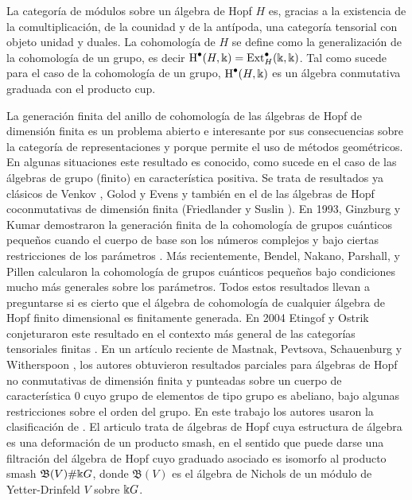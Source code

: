 \documentclass[fleqn,../tesis.tex]{subfiles}
\begin{document}
La categoría de módulos sobre un álgebra de Hopf $H$ es, gracias a la existencia de la comultiplicación, de la counidad y de la antípoda, una categoría
tensorial con objeto unidad y duales. La cohomología de $H$ se define como la generalización de la cohomología de un grupo, es decir
$\operatorname{H}^{\bullet}(H, \Bbbk) = \operatorname{Ext}_H^{\bullet}(\Bbbk, \Bbbk)$. Tal como sucede para el caso de la cohomología de un grupo, $\operatorname{H}^{\bullet}(H, \Bbbk)$
es un álgebra conmutativa graduada con el producto cup.

La generación finita del anillo de cohomología de las álgebras de Hopf de dimensión finita es un problema abierto e interesante por sus 
consecuencias sobre la categoría de representaciones y porque permite el uso de métodos geométricos. En algunas situaciones este resultado 
es conocido, como sucede en el caso de las álgebras 
de grupo (finito) en característica positiva. Se trata de resultados ya clásicos de Venkov \cite{Ve}, Golod \cite{Go} y Evens \cite{Ev} y también en el de las álgebras de 
Hopf coconmutativas de dimensión finita (Friedlander y Suslin \cite{FrSu}). En 1993, Ginzburg y Kumar demostraron la generación finita de 
la cohomología de grupos 
cuánticos peque\~nos cuando el cuerpo de base son los números complejos y bajo ciertas restricciones de los parámetros \cite{GiKu}. Más recientemente, Bendel, Nakano, Parshall, y Pillen \cite{BNPP} calcularon la cohomología de grupos cuánticos pequeños bajo condiciones mucho 
más generales sobre los parámetros. 
Todos estos resultados llevan a preguntarse si es cierto que el álgebra de cohomología de cualquier álgebra de Hopf finito dimensional es 
finitamente generada. 
En 2004 Etingof y Ostrik conjeturaron este resultado en el contexto más general de las categorías tensoriales finitas \cite{EtOs}. 
En un artículo reciente de Mastnak, Pevtsova, Schauenburg y Witherspoon \cite{MPSW}, los autores obtuvieron resultados parciales para álgebras de 
Hopf no conmutativas de dimensión finita y punteadas sobre un cuerpo de característica $0$ cuyo grupo de elementos de tipo grupo es abeliano, bajo algunas restricciones sobre el orden del grupo. En este trabajo los autores usaron la clasificación de \cite{AAH}.
El articulo trata de álgebras de Hopf cuya estructura de álgebra es una deformación de un producto smash, en el sentido que
puede darse una filtración del álgebra  de Hopf cuyo graduado asociado es isomorfo al producto smash $\mathfrak{B}(V)\#\Bbbk G$,
donde $\mathfrak{B}(V)$ es el álgebra de Nichols de un módulo de Yetter-Drinfeld $V$ sobre $\Bbbk G$.
\end{document}
